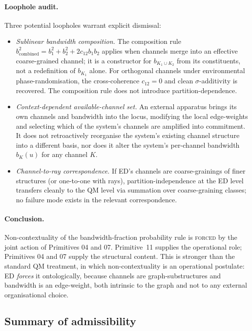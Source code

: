 \documentclass[11pt,a4paper]{article}
\begin{document}
\paragraph{Loophole audit.} Three potential loopholes warrant explicit dismissal:
\begin{itemize}
  \item \emph{Sublinear bandwidth composition.} The composition rule $b_\mathrm{combined}^2 = b_1^2 + b_2^2 + 2 c_{12} b_1 b_2$ applies when channels merge into an effective coarse-grained channel; it is a constructor for $b_{K_1 \cup K_2}$ from its constituents, not a redefinition of $b_{K_1}$ alone. For orthogonal channels under environmental phase-randomisation, the cross-coherence $c_{12} = 0$ and clean $\sigma$-additivity is recovered. The composition rule does not introduce partition-dependence.
  \item \emph{Context-dependent available-channel set.} An external apparatus brings its own channels and bandwidth into the locus, modifying the local edge-weights and selecting which of the system's channels are amplified into commitment. It does not retroactively reorganise the system's existing channel structure into a different basis, nor does it alter the system's per-channel bandwidth $b_K(u)$ for any channel $K$.
  \item \emph{Channel-to-ray correspondence.} If ED's channels are coarse-grainings of finer structures (or one-to-one with rays), partition-independence at the ED level transfers cleanly to the QM level via summation over coarse-graining classes; no failure mode exists in the relevant correspondence.
\end{itemize}

\paragraph{Conclusion.} Non-contextuality of the bandwidth-fraction probability rule is \textsc{forced} by the joint action of Primitives 04 and 07. Primitive~11 supplies the operational role; Primitives 04 and 07 supply the structural content. This is stronger than the standard QM treatment, in which non-contextuality is an operational postulate: ED \emph{forces} it ontologically, because channels are graph-substructures and bandwidth is an edge-weight, both intrinsic to the graph and not to any external organisational choice.

\subsection{Summary of admissibility}
\end{document}
